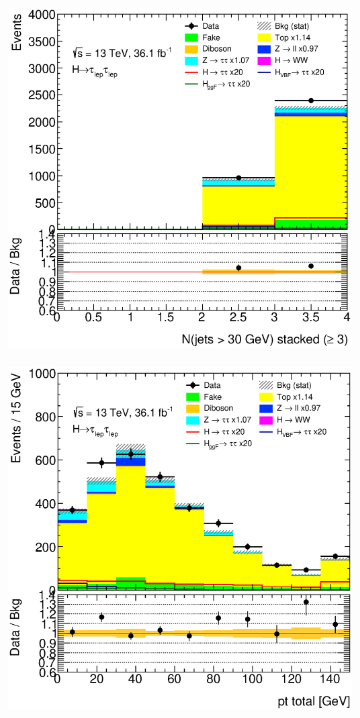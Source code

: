 \begin{figure}[htb]
\begin{subfigure}[t]{0.3\textwidth}
    \end{subfigure}
    \begin{subfigure}[t]{0.3\textwidth}
        \includegraphics[width=\textwidth]{./plots/mva/modeling/input_vars/VBF_CR/ll-CutMVAVBFCatTopCR-nJets30Stacked3-lin.eps}
    \end{subfigure}
    \begin{subfigure}[t]{0.3\textwidth}
        \includegraphics[width=\textwidth]{./plots/mva/modeling/input_vars/VBF_CR/ll-CutMVAVBFCatTopCR-PtTotal-lin.eps}

\end{subfigure}
\end{figure}
